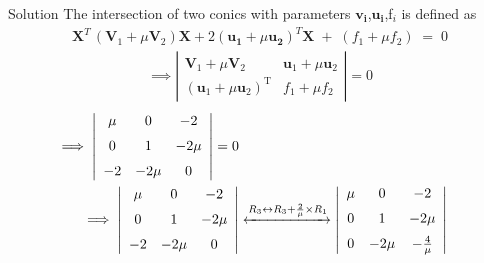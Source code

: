 \documentclass{beamer}
\numberwithin{equation}{section}
\theoremstyle{remark}
\let\vec\mathbf
\begin{document}
\begin{frame}{Solution}
The intersection of two conics with parameters $\vec{v_i}$,$\vec{u_i}$,f$_i$ is defined as 
\begin{align}
\vec{X}^{T}\,(\vec{V}_{1} + \mu \vec{V}_{2})\vec{X} + 2(\vec{u_1} + \mu \vec{u_2})^{T}\vec{X} \;+\; (f_{1} + \mu f_{2}) \;=\; 0
\end{align}
\begin{align}
\implies \left|
\begin{array}{cc}
\mathbf{V}_1 + \mu \mathbf{V}_2 & \mathbf{u}_1 + \mu \mathbf{u}_2 \\[6pt]
(\mathbf{u}_1 + \mu \mathbf{u}_2)^{\mathrm{T}} & f_1 + \mu f_2
\end{array}
\right| = 0
\end{align}
\begin{align}
    \implies 
\left|
\begin{array}{ccc}
\mu & 0 & -2 \\[6pt]
0 & 1  & -2\mu \\[6pt]
-2 & -2\mu & 0
\end{array}
\right| = 0 \\
\implies \left|
\begin{array}{ccc}
\mu & 0 & -2 \\[6pt]
0 & 1  & -2\mu \\[6pt]
-2 & -2\mu & 0
\end{array}
\right| &\xleftrightarrow{R_3 \leftrightarrow R_3 + \frac{2}{\mu}\times R_1} \left|
\begin{array}{ccc}
\mu & 0 & -2 \\[6pt]
0 & 1  & -2\mu \\[6pt]
0 & -2\mu & -\frac{4}{\mu}
\end{array}
\right|
\end{align}
\end{frame}
\end{document}
